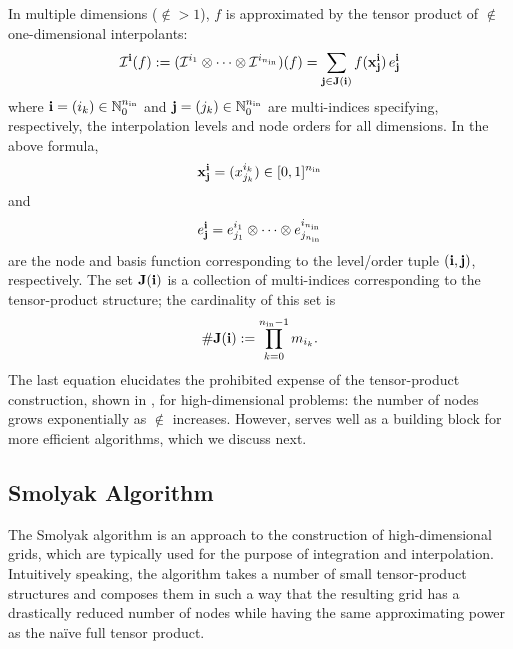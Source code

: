 In multiple dimensions ($\nin > 1$), $f$ is approximated by the tensor product
of $\nin$ one-dimensional interpolants:
\begin{equation} \elab{tensor-product}
  \I{\vi}(f) := (\I{i_1} \otimes \cdots \otimes \I{i_\nin})(f) = \sum_{\vj \in
  \v{J}(\vi)} f(\v{x}^\vi_\vj) \, \e^\vi_\vj
\end{equation}
where $\mathbf{i} = (i_k) \in \mathbb{N}_0^{n_\text{in}}$ and $\mathbf{j} = (j_k) \in \mathbb{N}_0^{n_\text{in}}$ are
multi-indices specifying, respectively, the interpolation levels and node orders
for all dimensions. In the above formula,
\[
  \mathbf{x}^{\mathbf{i}}_{\mathbf{j}} = (x^{i_k}_{j_k}) \in [0, 1]^{n_\text{in}}
\]
and
\[
  e^{\mathbf{i}}_{\mathbf{j}} = e^{i_1}_{j_1} \otimes \cdots \otimes e^{i_{n_\text{in}}}_{j_{n_\text{in}}}
\]
are the node and basis function corresponding to the level/order tuple $(\mathbf{i},
\mathbf{j})$, respectively. The set $\mathbf{J}(\mathbf{i})$ is a collection of multi-indices
corresponding to the tensor-product structure; the cardinality of this set is
\[
  \# \mathbf{J}(\mathbf{i}) := \prod_{k = 0}^{{n_\text{in}} - 1} m_{i_k}.
\]
The last equation elucidates the prohibited expense of the tensor-product
construction, shown in , for high-dimensional problems: the
number of nodes grows exponentially as $\nin$ increases. However,
 serves well as a building block for more efficient
algorithms, which we discuss next.

\subsection{Smolyak Algorithm}
The Smolyak algorithm is an approach to the construction of high-dimensional
grids, which are typically used for the purpose of integration and
interpolation. Intuitively speaking, the algorithm takes a number of small
tensor-product structures and composes them in such a way that the resulting
grid has a drastically reduced number of nodes while having the same
approximating power as the na\"{i}ve full tensor product.


